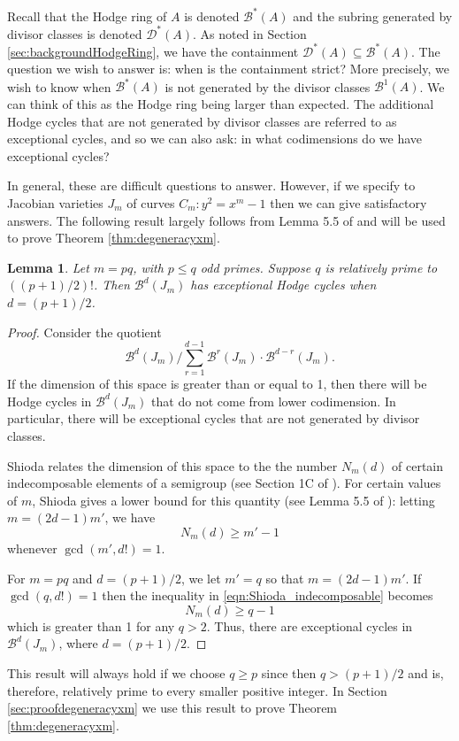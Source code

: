 \documentclass[reqno, oneside, 12pt]{amsart}
\newtheorem{lemma}[theorem]{Lemma}
\theoremstyle{remark}
\numberwithin{equation}{section}
\begin{document}
Recall that the Hodge ring of $A$ is denoted $\mathscr B^*(A)$ and the subring generated by divisor classes is denoted $\mathscr D^*(A)$. As noted in Section \ref{sec:backgroundHodgeRing}, we have the containment $\mathscr D^*(A) \subseteq \mathscr B^*(A)$. The question we wish to answer is: when is the containment strict? More precisely, we wish to know when $\mathscr B^*(A)$ is not generated by the divisor classes $\mathscr B^1(A)$. We can think of this as the Hodge ring being larger than expected. The additional Hodge cycles that are not generated by divisor classes are referred to as {exceptional cycles}, and so we can also ask: in what codimensions do we have exceptional cycles?


In general, these are difficult questions to answer. However, if we specify to Jacobian varieties $J_m$ of curves $C_m\colon y^2=x^m-1$ then we can give satisfactory answers. The following result largely follows from Lemma 5.5 of \cite{Shioda82} and will be used to prove Theorem \ref{thm:degeneracyxm}.

\begin{lemma}\label{lemma:exceptionalHodge}
Let $m=pq$, with $p\leq q$ odd primes. Suppose $q$ is relatively prime to $((p+1)/2)!$. Then  $\mathcal B^d(J_m)$ has exceptional Hodge cycles when $d=(p+1)/2$. 
\end{lemma}

\begin{proof}
Consider the quotient
$$\mathcal B^d(J_m)\bigg/\sum_{r=1}^{d-1} \mathcal B^r(J_m)\cdot \mathcal B^{d-r}(J_m).$$
If the dimension of this space is greater than or equal to 1, then there will be Hodge cycles in $\mathcal B^d(J_m)$ that do not come from lower codimension. In particular, there will be exceptional cycles that are not generated by divisor classes. 

Shioda relates the dimension of this space to the the number $N_m(d)$ of certain indecomposable elements of a semigroup (see Section 1C of \cite{Shioda82}). For certain values of $m$, Shioda gives a lower bound for this quantity (see Lemma 5.5 of  \cite{Shioda82}): letting $m=(2d-1)m'$, we have
\begin{equation}\label{eqn:Shioda_indecomposable}
    N_m(d)\geq m'-1
\end{equation}
whenever $\gcd(m',d!)=1$.

For $m=pq$ and $d=(p+1)/2$, we let $m'=q$ so that $m=(2d -1)m'.$ If  $\gcd(q,d!)=1$ then the inequality in \eqref{eqn:Shioda_indecomposable} becomes
$$N_m(d)\geq q-1$$
which is greater than 1 for any $q>2$. Thus, there are exceptional cycles in $\mathcal B^d(J_m)$, where $d=(p+1)/2$.
\end{proof}
This result will always hold if we choose $q\geq p$ since then $q>(p+1)/2$ and is, therefore, relatively prime to every smaller positive integer. In Section \ref{sec:proofdegeneracyxm} we use this result to prove Theorem \ref{thm:degeneracyxm}.
\end{document}

